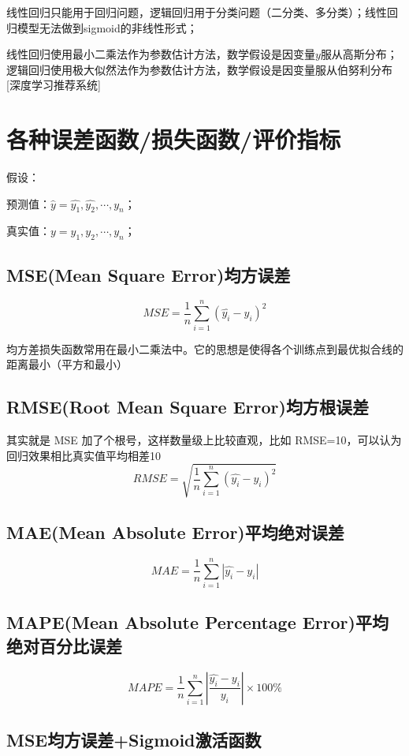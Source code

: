 \documentclass[12pt]{article}
\begin{document}
线性回归只能用于回归问题，逻辑回归用于分类问题（二分类、多分类）；线性回归模型无法做到sigmoid的非线性形式；

线性回归使用最小二乘法作为参数估计方法，数学假设是因变量$y$服从高斯分布；逻辑回归使用极大似然法作为参数估计方法，数学假设是因变量服从伯努利分布[深度学习推荐系统]

\section{各种误差函数/损失函数/评价指标}
假设：

预测值：$\hat{y} = {\hat{y_1},\hat{y_2},\cdots,\hat{y_n}}$；

真实值：$y = {y_1, y_2, \cdots, y_n}$；

\subsection{MSE(Mean Square Error)均方误差}
$$MSE = \frac{1}{n}\sum_{i=1}^{n}(\hat{y_i} - y_i)^2$$

均方差损失函数常用在最小二乘法中。它的思想是使得各个训练点到最优拟合线的距离最小（平方和最小）

\subsection{RMSE(Root Mean Square Error)均方根误差}
其实就是 MSE 加了个根号，这样数量级上比较直观，比如 RMSE=10，可以认为回归效果相比真实值平均相差10
$$RMSE = \sqrt{\frac{1}{n}\sum_{i=1}^{n}(\hat{y_i} - y_i)^2}$$

\subsection{MAE(Mean Absolute Error)平均绝对误差}
$$MAE = \frac{1}{n}\sum_{i=1}^{n}|\hat{y_i} - y_i|$$

\subsection{MAPE(Mean Absolute Percentage Error)平均绝对百分比误差}
$$MAPE = \frac{1}{n}\sum_{i=1}^{n}|\frac{\hat{y_i} - y_i}{y_i}|\times 100\%$$

\subsection{MSE均方误差+Sigmoid激活函数\cite{Commonly_Loss_Functions}}
\end{document}
